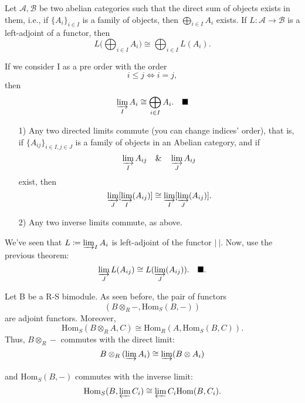 \documentclass[../category_theory.tex]{subfiles}
\begin{document}
\begin{crl*}
	Let \(\mathcal{A}, \mathcal{B}\) be two abelian categories such that the direct sum of objects exists in them, i.e., if \(\{A_{i}\}_{i\in I}\) is a family of objects, then \(\bigoplus\limits_{i\in I}A_{i}\) exists. If \(L:\mathcal{A}\rightarrow \mathcal{B}\) is a left-adjoint of a functor, then
	\[
		L \biggl(\bigoplus_{i\in I}A_{i}\biggr)\cong \bigoplus_{i\in I}L(A_{i}).
	\]
\end{crl*}
\begin{proof*}
	If we consider I as a pre order with the order
	\[
		i\leq j \Longleftrightarrow i=j,
	\]
	then
	\[
		\varinjlim_{I}A_{i}\cong \bigoplus_{i\in I}A_{i}.\quad \text{$\blacksquare$}
	\]
\end{proof*}
\begin{crl*}
	\begin{itemize}
		\item[1)] Any two directed limits commute (you can change indices' order), that is, if \(\{A_{ij}\}_{i\in I, j\in J}\) is a family of objects in an Abelian category, and if
		      \[
			      \varinjlim_{I}A_{ij}\quad\&\quad \varinjlim_{J}A_{ij}
		      \]
		      exist, then
		      \[
			      \varinjlim_{J}[\varinjlim_{I}(A_{ij})]\cong \varinjlim_{I}[\varinjlim_{J}(A_{ij})].
		      \]
		\item[2)] Any two inverse limits commute, as above.
	\end{itemize}
\end{crl*}
\begin{proof*}
	We've seen that \(L\coloneqq \varinjlim_{I}A_{i}\) is left-adjoint of the functor \(|\:|\). Now, use the previous theorem:
	\[
		\varinjlim_{J} L(A_{ij})\cong L(\varinjlim_{J}(A_{ij})).\quad \text{$\blacksquare$}.
	\]
\end{proof*}
\begin{example}
	Let B be a R-S bimodule. As seen before, the pair of functors
	\[
		(B \otimes_{R}-, \mathrm{Hom}_{S}(B, -))
	\]
	are adjoint functors. Moreover,
	\[
		\mathrm{Hom}_{S}(B\otimes_{R} A, C)\cong \mathrm{Hom}_{R}(A, \mathrm{Hom}_{S}(B, C)).
	\]
	Thus, \(B\otimes_{R}-\) commutes with the direct limit:
	\[
		B\otimes _{R}(\varinjlim_{}A_{i})\cong \varinjlim_{}(B\otimes A_{i})
	\]
	and \(\mathrm{Hom}_{S}(B, -)\) commutes with the inverse limit:
	\[
		\mathrm{Hom}_{S}(B, \varprojlim_{}C_{i})\cong \varprojlim_{}C_{i}\mathrm{Hom}(B, C_{i}).
	\]
\end{example}
\end{document}
